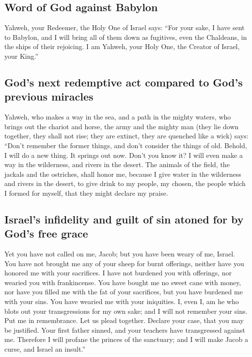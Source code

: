 \hypertarget{word-of-god-against-babylon}{%
\subsection{Word of God against
Babylon}\label{word-of-god-against-babylon}}

 Yahweh, your Redeemer, the Holy One of Israel says:
``For your sake, I have sent to Babylon, and I will bring all of them
down as fugitives, even the Chaldeans, in the ships of their rejoicing.
 I am Yahweh, your Holy One, the Creator of Israel, your
King.''

\hypertarget{gods-next-redemptive-act-compared-to-gods-previous-miracles}{%
\subsection{God's next redemptive act compared to God's previous
miracles}\label{gods-next-redemptive-act-compared-to-gods-previous-miracles}}

 Yahweh, who makes a way in the sea, and a path in the
mighty waters,  who brings out the chariot and horse, the
army and the mighty man (they lie down together, they shall not rise;
they are extinct, they are quenched like a wick) says: 
``Don't remember the former things, and don't consider the things of
old.  Behold, I will do a new thing. It springs out now.
Don't you know it? I will even make a way in the wilderness, and rivers
in the desert.  The animals of the field, the jackals and
the ostriches, shall honor me, because I give water in the wilderness
and rivers in the desert, to give drink to my people, my chosen,
 the people which I formed for myself, that they might
declare my praise.

\hypertarget{israels-infidelity-and-guilt-of-sin-atoned-for-by-gods-free-grace}{%
\subsection{Israel's infidelity and guilt of sin atoned for by God's
free
grace}\label{israels-infidelity-and-guilt-of-sin-atoned-for-by-gods-free-grace}}

 Yet you have not called on me, Jacob; but you have been
weary of me, Israel.  You have not brought me any of your
sheep for burnt offerings, neither have you honored me with your
sacrifices. I have not burdened you with offerings, nor wearied you with
frankincense.  You have bought me no sweet cane with
money, nor have you filled me with the fat of your sacrifices, but you
have burdened me with your sins. You have wearied me with your
iniquities.  I, even I, am he who blots out your
transgressions for my own sake; and I will not remember your sins.
 Put me in remembrance. Let us plead together. Declare
your case, that you may be justified.  Your first father
sinned, and your teachers have transgressed against me. 
Therefore I will profane the princes of the sanctuary; and I will make
Jacob a curse, and Israel an insult.''

